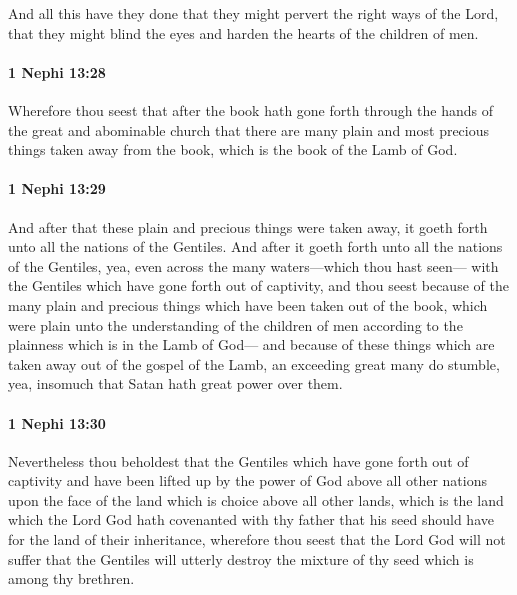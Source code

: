 			And all this have they done that they might pervert the right ways of the Lord,
			that they might blind the eyes and harden the hearts of the children of men.

		\paragraph{1 Nephi 13:28} %
			\label{1NEPHI-13-28}

			Wherefore thou seest that after the book hath gone forth
			through the hands of the great and abominable church
			that there are many plain and most precious things taken away from the book,
			which is the book of the Lamb of God.

		\paragraph{1 Nephi 13:29} %
			\label{1NEPHI-13-29}

			And after that these plain and precious things were taken away,
			it goeth forth unto all the nations of the Gentiles.
			And after it goeth forth unto all the nations of the Gentiles,
			yea, even across the many waters---which thou hast seen---
			with the Gentiles which have gone forth out of captivity,
			and thou seest because of the many plain and precious things
			which have been taken out of the book,
			which were plain unto the understanding of the children of men
			according to the plainness which is in the Lamb of God---
			and because of these things which are taken away out of the gospel of the Lamb,
			an exceeding great many do stumble,
			yea, insomuch that Satan hath great power over them.

		\paragraph{1 Nephi 13:30} %
			\label{1NEPHI-13-30}

			Nevertheless thou beholdest that the Gentiles
			which have gone forth out of captivity
			and have been lifted up by the power of God
			above all other nations upon the face of the land
			which is choice above all other lands,
			which is the land which the Lord God hath covenanted with thy father
			that his seed should have for the land of their inheritance,
			wherefore thou seest that the Lord God will not suffer
			that the Gentiles will utterly destroy the mixture of thy seed
			which is among thy brethren.

